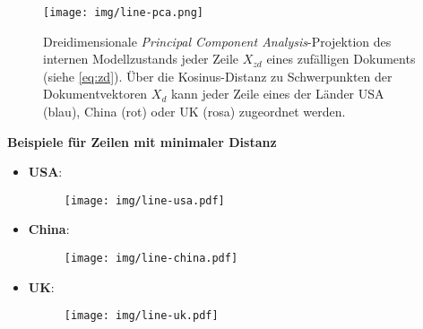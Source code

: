 \documentclass[bachelor,german]{info1thesis}
\begin{document}
\begin{figure}[h!]
\centering
\texttt{[image: img/line-pca.png]}
\caption{Dreidimensionale \textit{Principal Component Analysis}-Projektion des internen Modellzustands jeder Zeile $X_{zd}$ eines zufälligen Dokuments (siehe \autoref{eq:zd}). Über die Kosinus-Distanz zu Schwerpunkten der Dokumentvektoren $X_d$ kann jeder Zeile eines der Länder USA (blau), China (rot) oder UK (rosa) zugeordnet werden.}
\end{figure}

\textbf{Beispiele für Zeilen mit minimaler Distanz}
\begin{itemize}
\item \textbf{USA}:%
\vspace{-.5em}
\begin{figure}[h!]
\centering
\texttt{[image: img/line-usa.pdf]}
\end{figure}
\vspace{-1.5em}
\item \textbf{China}:%
\vspace{-.5em}
\begin{figure}[h!]
\centering
\texttt{[image: img/line-china.pdf]}
\end{figure}
\vspace{-1.5em}
\item \textbf{UK}:%
\vspace{-.5em}
\begin{figure}[h!]
\centering
\texttt{[image: img/line-uk.pdf]}
\end{figure}
\end{itemize}

\end{document}
